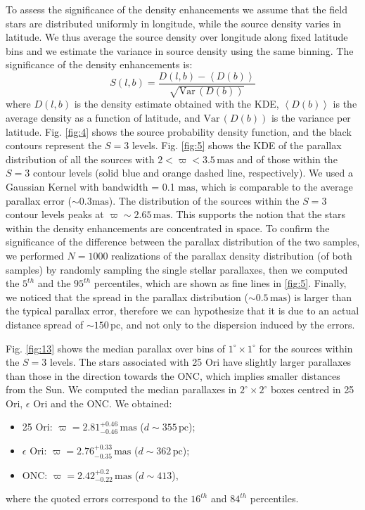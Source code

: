 \documentclass[onecolumn]{aa} %
\begin{document}
To assess the significance of the density enhancements we assume that the field stars are distributed uniformly in longitude, while the source density varies in latitude. We thus average the source density over longitude along fixed latitude bins and we estimate the variance in source density using the same binning. The significance of the density enhancements is:
\begin{equation}
S(l, b) = \frac{ D(l, b) - \left\langle D(b) \right\rangle}{\sqrt{\mathrm{Var} \,(D(b))}}
\end{equation}
where $D(l, b)$ is the density estimate obtained with the KDE, $\left\langle D(b) \right\rangle$ is the average density as a function of latitude, and $\mathrm{Var}\,(D(b))$ is the variance per latitude. Fig. \ref{fig:4} shows the source probability density function, and the black contours represent the $S = 3$ levels. 
Fig. \ref{fig:5} shows the KDE of the parallax distribution
of all the sources with $2 < \varpi < 3.5 \, \mathrm{mas}$ and of those within the $S = 3$ contour levels (solid blue and orange dashed line, respectively). We used a Gaussian Kernel with bandwidth = 0.1 $\mathrm{mas}$, which is comparable to the average parallax error ($\sim 0.3 \mathrm{mas}$).
The distribution of the sources within the $S=3$ contour levels peaks at  $\varpi \sim 2.65 \, \mathrm{mas}$. This supports the notion that the stars within the density enhancements are concentrated in space.
To confirm the significance of the difference between the parallax distribution of the two samples, we performed $N = 1000$ realizations of the parallax density distribution (of both samples) by randomly sampling the single stellar parallaxes, then we computed  the $5^{th}$ and the $95^{th}$ percentiles, which are shown as fine lines in \ref{fig:5}.
Finally, we noticed that the spread in the parallax distribution ($\sim 0.5 \, \mathrm{mas}$) is larger than the typical parallax error, therefore we can hypothesize that it is due to an actual distance spread of $\sim 150 \, \mathrm{pc}$, and not only to the dispersion induced by the errors.

Fig. \ref{fig:13} shows the median parallax over bins of $1^{\circ} \times 1^{\circ}$ for the sources within the $S = 3$ levels.
The stars associated with 25 Ori have slightly larger parallaxes than those in the direction towards the ONC, which implies smaller distances from the Sun. We computed the median parallaxes in $2^{\circ}\times 2^{\circ}$ boxes centred in 25 Ori, $\epsilon$ Ori and the ONC. We obtained:
\begin{itemize}
\item 25 Ori: $\varpi = 2.81^{+0.46}_{-0.46} \,  \mathrm{mas}$  ($d \sim 355 \, \mathrm{pc}$);
\item $\epsilon$ Ori: $\varpi = 2.76^{+0.33}_{-0.35} \,  \mathrm{mas}$ ($d \sim 362 \, \mathrm{pc}$);
\item ONC: $\varpi = 2.42^{+0.2}_{-0.22} \,  \mathrm{mas}$ ($d \sim 413$),
\end{itemize}
where the quoted errors correspond to the $16^{th}$ and $84^{th}$ percentiles.
\end{document}
